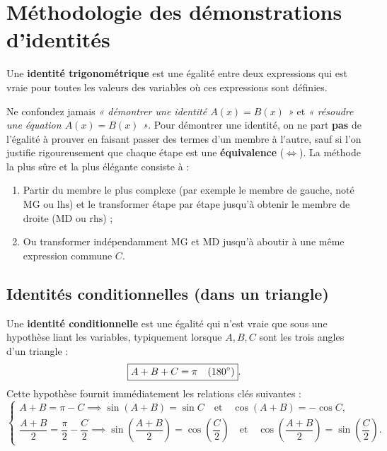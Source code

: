 \section{Méthodologie des démonstrations d'identités}

Une \textbf{identité trigonométrique} est une égalité entre deux expressions qui est vraie pour toutes les valeurs des variables où ces expressions sont définies.

\begin{attention}
Ne confondez jamais \emph{« démontrer une identité $A(x) = B(x)$ »} et \emph{« résoudre une équation $A(x) = B(x)$ »}. Pour démontrer une identité, on ne part \textbf{pas} de l'égalité à prouver en faisant passer des termes d'un membre à l'autre, sauf si l'on justifie rigoureusement que chaque étape est une \textbf{équivalence} ($\iff$). La méthode la plus sûre et la plus élégante consiste à :
\begin{enumerate}
    \item Partir du membre le plus complexe (par exemple le membre de gauche, noté $\text{MG}$ ou $\text{lhs}$) et le transformer étape par étape jusqu'à obtenir le membre de droite ($\text{MD}$ ou $\text{rhs}$) ;
    \item Ou transformer indépendamment $\text{MG}$ et $\text{MD}$ jusqu'à aboutir à une même expression commune $C$.
\end{enumerate}
\end{attention}

\subsection{Identités conditionnelles (dans un triangle)}

Une \textbf{identité conditionnelle} est une égalité qui n'est vraie que sous une hypothèse liant les variables, typiquement lorsque $A, B, C$ sont les trois angles d'un triangle :
\[
    \boxed{A + B + C = \pi \quad (180\degree)}.
\]
Cette hypothèse fournit immédiatement les relations clés suivantes :
\[
    \begin{cases}
        A + B = \pi - C \implies \sin(A+B) = \sin C \quad \text{et} \quad \cos(A+B) = -\cos C, \\[4pt]
        \dfrac{A+B}{2} = \dfrac{\pi}{2} - \dfrac{C}{2} \implies \sin\left(\dfrac{A+B}{2}\right) = \cos\left(\dfrac{C}{2}\right) \quad \text{et} \quad \cos\left(\dfrac{A+B}{2}\right) = \sin\left(\dfrac{C}{2}\right).
    \end{cases}
\]

